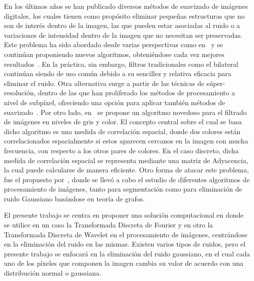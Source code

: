 \documentclass[a4paper,10pt,twocolumn]{article}
\begin{document}
 En los últimos años se han publicado diversos métodos de suavizado de imágenes digitales, los cuales tienen como propósito eliminar pequeñas estructuras que no son de interés dentro de la imagen, las que pueden estar asociadas al ruido o a variaciones de intensidad dentro de la imagen que no necesitan ser preservadas. Este problema ha sido abordado desde varias perspectivas como en~\cite{morel05} y se continúan proponiendo nuevos algoritmos, obteniéndose cada vez mejores resultados~\cite{egiazarian09}. En la práctica, sin embargo, filtros tradicionales como el bilateral~\cite{tomasi98} continúan siendo de uso común debido a su sencillez y relativa eficacia para eliminar el ruido. Otra alternativa surge a partir de las técnicas de súper-resolución, dentro de las que han proliferado los métodos de procesamiento a nivel de subpíxel, ofreciendo una opción para aplicar también métodos de suavizado~\cite{galvez17}. Por otro lado, en~\cite{estrtada12} se propone un algoritmo novedoso para el filtrado de imágenes en niveles de gris y color. El concepto central sobre el cual se basa dicho algoritmo es una medida de correlación espacial, donde dos colores están correlacionados espacialmente si estos aparecen cercanos en la imagen con mucha frecuencia, con respecto a los otros pares de colores. En el caso discreto, dicha medida de correlación espacial se representa mediante una matriz de Adyacencia, la cual puede calcularse de manera eficiente. Otro forma de atacar este problema, fue el propuesto por~\cite{perez15}, donde se llevó a cabo el estudio de diferentes algoritmos de procesamiento de imágenes, tanto para segmentación como para eliminación de ruido Gaussiano basándose en teoría de grafos.

 El presente trabajo se centra en proponer una solución computacional en donde se utilice en un caso la Transformada Discreta de Fourier y en otro la Transformada Discreta de Wavelet en el procesamiento de imágenes, centrándose en la eliminación del ruido en las mismas. Existen varios tipos de ruidos, pero el presente trabajo se enfocará en la eliminación del ruido gaussiano, en el cual cada uno de los píxeles que componen la imagen cambia su valor de acuerdo con una distribución normal o gaussiana.


\end{document}
